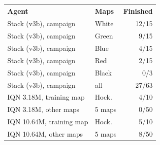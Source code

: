 \begin{tabular}{@{}llr@{}}
\toprule
Agent & Maps & Finished \\
\midrule
Stack (v3b), campaign & White & 12/15 \\
Stack (v3b), campaign & Green & 9/15 \\
Stack (v3b), campaign & Blue & 4/15 \\
Stack (v3b), campaign & Red & 2/15 \\
Stack (v3b), campaign & Black & 0/3 \\
Stack (v3b), campaign & all & 27/63 \\
IQN 3.18M, training map & Hock. & 4/10 \\
IQN 3.18M, other maps & 5 maps & 0/50 \\
IQN 10.64M, training map & Hock. & 5/10 \\
IQN 10.64M, other maps & 5 maps & 8/50 \\
\bottomrule
\end{tabular}
